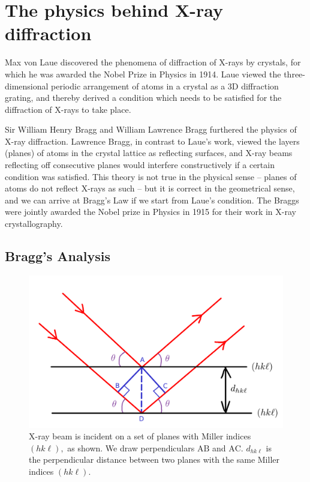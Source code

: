 \section{The physics behind X-ray diffraction}

Max von Laue discovered the phenomena of diffraction of X-rays by crystals, for which he was awarded the Nobel Prize in Physics in 1914. Laue viewed the three-dimensional periodic arrangement of atoms in a crystal as a 3D diffraction grating, and thereby derived a condition which needs to be satisfied for the diffraction of X-rays to take place.

Sir William Henry Bragg and William Lawrence Bragg furthered the physics of X-ray diffraction. Lawrence Bragg, in contrast to Laue's work, viewed the layers (planes) of atoms in the crystal lattice as reflecting surfaces, and X-ray beams reflecting off consecutive planes would interfere constructively if a certain condition was satisfied. This theory is not true in the physical sense -- planes of atoms do not reflect X-rays as such -- but it is correct in the geometrical sense, and we can arrive at Bragg's Law if we start from Laue's condition. The Braggs were jointly awarded the Nobel prize in Physics in 1915 for their work in X-ray crystallography.

\subsection{Bragg's Analysis}
	
	\begin{figure}
	\centering
	\includegraphics[scale=0.15]{bragg_law.png}
	\caption{\label{fig:bragg_law}X-ray beam is incident on a set of planes with Miller indices $(hk\ell),$ as shown. We draw perpendiculars $\mathrm{AB}$ and $\mathrm{AC}$. $d_{hk\ell}$ is the perpendicular distance between two planes with the same Miller indices $(hk\ell).$}
	\end{figure}

